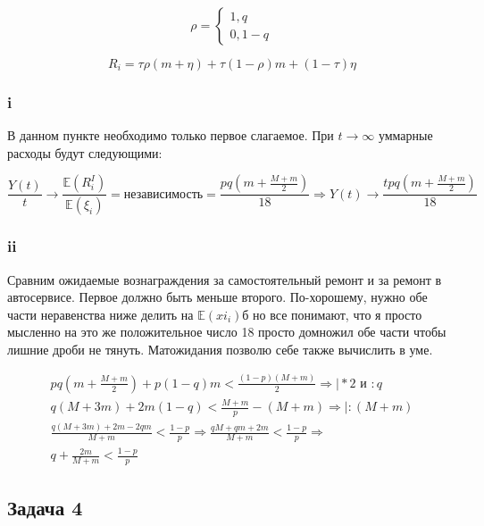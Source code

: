 \documentclass[a4paper,12pt]{article}
\def \mbb{\mathbb}
\def \E{\mbb{E}}
\begin{document}
  \[\rho = \begin{cases}
 1,  q\\
 0, 1-q
 \end{cases}  \]
 
 \[ R_i = \tau \rho (m + \eta) + \tau (1-\rho)m + (1 - \tau) \eta \]
 

\subsubsection{i}

В данном пункте необходимо только первое слагаемое. При $  t \to \infty $ уммарные расходы будут следующими:

\[ \frac{Y(t)}{t} \to \frac{\E(R_i^I)}{\E(\xi_i)} = \text{независимость} = \frac{pq\left(m + \frac{M + m}{2}\right)}{18} \Rightarrow Y(t) \to \frac{tpq\left(m + \frac{M + m}{2}\right)}{18}  \]

\subsubsection{ii}

Сравним ожидаемые вознаграждения за самостоятельный ремонт и за ремонт в автосервисе. Первое должно быть меньше второго. По-хорошему, нужно обе части неравенства ниже делить на $ \E(xi_i) $б но все понимают, что я просто мысленно на это же положительное число 18 просто домножил обе части чтобы лишние дроби не тянуть. Матожидания позволю себе также вычислить в уме.

\begin{equation}
\begin{aligned}
pq\left(m + \frac{M + m}{2}\right) + p(1-q)m < \frac{(1-p)(M+m)}{2} \Rightarrow \Big| *2 \text{ и } :q\\
q(M + 3m) + 2m(1-q) < \frac{M+m}{p} - (M + m) \Rightarrow \Big| :(M+m) \\
\frac{q(M + 3m) + 2m - 2qm}{M+m} < \frac{1 - p}{p} \Rightarrow
\frac{qM + qm + 2m}{M + m} < \frac{1 - p}{p} \Rightarrow \\
q + \frac{2m}{M + m} < \frac{1 - p}{p} 
\end{aligned}
\end{equation}

\subsection{Задача 4}
\end{document}
